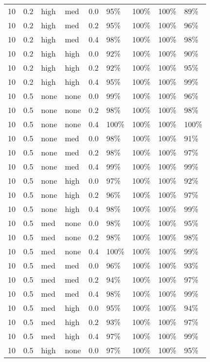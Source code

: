\begin{longtable}{rrllrllll}
  10 & 0.2 & high & med & 0.0 & 95\% & 100\% & 100\% & 89\% \\ 
  10 & 0.2 & high & med & 0.2 & 95\% & 100\% & 100\% & 96\% \\ 
  10 & 0.2 & high & med & 0.4 & 98\% & 100\% & 100\% & 98\% \\ 
  10 & 0.2 & high & high & 0.0 & 92\% & 100\% & 100\% & 90\% \\ 
  10 & 0.2 & high & high & 0.2 & 92\% & 100\% & 100\% & 95\% \\ 
  10 & 0.2 & high & high & 0.4 & 95\% & 100\% & 100\% & 99\% \\ 
  10 & 0.5 & none & none & 0.0 & 99\% & 100\% & 100\% & 96\% \\ 
  10 & 0.5 & none & none & 0.2 & 98\% & 100\% & 100\% & 98\% \\ 
  10 & 0.5 & none & none & 0.4 & 100\% & 100\% & 100\% & 100\% \\ 
  10 & 0.5 & none & med & 0.0 & 98\% & 100\% & 100\% & 91\% \\ 
  10 & 0.5 & none & med & 0.2 & 98\% & 100\% & 100\% & 97\% \\ 
  10 & 0.5 & none & med & 0.4 & 99\% & 100\% & 100\% & 99\% \\ 
  10 & 0.5 & none & high & 0.0 & 97\% & 100\% & 100\% & 92\% \\ 
  10 & 0.5 & none & high & 0.2 & 96\% & 100\% & 100\% & 97\% \\ 
  10 & 0.5 & none & high & 0.4 & 98\% & 100\% & 100\% & 99\% \\ 
  10 & 0.5 & med & none & 0.0 & 98\% & 100\% & 100\% & 95\% \\ 
  10 & 0.5 & med & none & 0.2 & 98\% & 100\% & 100\% & 98\% \\ 
  10 & 0.5 & med & none & 0.4 & 100\% & 100\% & 100\% & 99\% \\ 
  10 & 0.5 & med & med & 0.0 & 96\% & 100\% & 100\% & 93\% \\ 
  10 & 0.5 & med & med & 0.2 & 94\% & 100\% & 100\% & 97\% \\ 
  10 & 0.5 & med & med & 0.4 & 98\% & 100\% & 100\% & 99\% \\ 
  10 & 0.5 & med & high & 0.0 & 95\% & 100\% & 100\% & 94\% \\ 
  10 & 0.5 & med & high & 0.2 & 93\% & 100\% & 100\% & 97\% \\ 
  10 & 0.5 & med & high & 0.4 & 97\% & 100\% & 100\% & 99\% \\ 
  10 & 0.5 & high & none & 0.0 & 97\% & 100\% & 100\% & 95\% \\ 

\end{longtable}
